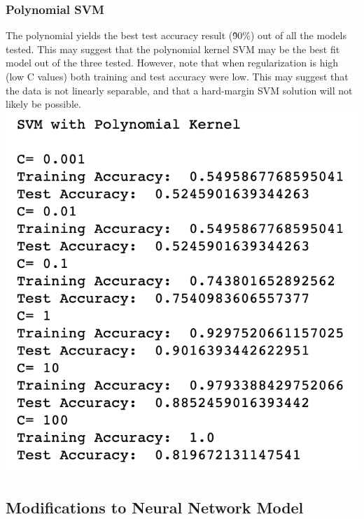 \documentclass[11pt, oneside]{article}
\begin{document}
\subsubsection *{Polynomial SVM}
The polynomial yields the best test accuracy result (\~90\%) out of all the models tested. This may suggest that the polynomial kernel SVM may be the best fit model out of the three tested. However, note that when regularization is high (low C values) both training and test accuracy were low. This may suggest that the data is not linearly separable, and that a hard-margin SVM solution will not likely be possible.\\
\includegraphics{6}
\subsection *{Modifications to Neural Network Model}
\end{document}
